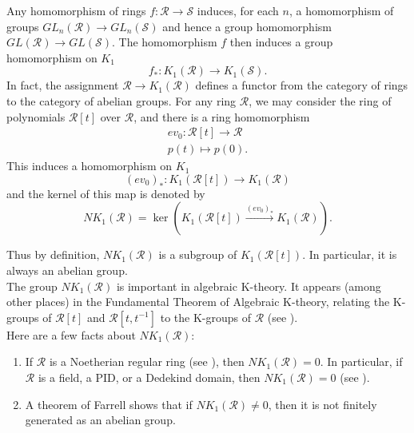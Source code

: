 \documentclass{amsart}
\newcommand{\si}{\index}
\theoremstyle{definition}
\theoremstyle{definition}
\newcommand{\calR}{\mathcal{R}}
\newcommand{\calS}{\mathcal{S}}
\numberwithin{equation}{subsection}
\begin{document}
Any homomorphism of rings $f \colon \calR \to \calS$ induces, for each $n$, a homomorphism of groups $GL_{n}(\calR) \to GL_{n}(\calS)$ and hence a group homomorphism $GL(\calR) \to GL(\calS)$. The homomorphism $f$ then induces a group homomorphism on $K_{1}$
$$f_{*} \colon K_{1}(\calR) \to K_{1}(\calS).$$
In fact, the assignment $\calR \to K_{1}(\calR)$ defines a functor from the category of rings to the category of abelian groups. For any ring $\calR$, we may consider the ring of polynomials $\calR[t]$ over $\calR$, and there is a ring homomorphism
\begin{gather*}
ev_{0} \colon \calR[t] \to \calR\\
p(t) \mapsto p(0).
\end{gather*}
This induces a homomorphism on $K_{1}$
$$(ev_{0})_{*} \colon K_{1}(\calR[t]) \to K_{1}(\calR)$$
and the kernel of this map is denoted by\si{$NK_{1}$ of a ring}
$$NK_{1}(\calR) = \ker \left(K_{1}(\calR[t]) \stackrel{(ev_{0})_{*}}\longrightarrow K_{1}(\calR)\right).$$

Thus by definition, $NK_{1}(\calR)$ is a subgroup of $K_{1}(\calR[t])$. In particular, it is always an abelian group.\\

The group $NK_{1}(\calR)$ is important in algebraic K-theory. It appears (among other places) in the Fundamental Theorem of Algebraic K-theory, relating the K-groups of $\calR[t]$ and $\calR[t,t^{-1}]$ to the K-groups of $\calR$
(see \cite[Chapter III]{WeibelBook}).\\



Here are a few facts about $NK_{1}(\calR)$:
\begin{enumerate}
\item
  If $\calR$ is a Noetherian regular ring
  (see \cite[Chapter 3]{RosenbergBook}), then $NK_{1}(\calR) = 0$. In particular, if $\calR$ is a field, a PID, or a Dedekind domain, then $NK_{1}(\calR) = 0$ (see \cite[III.3.8]{WeibelBook}).
\item
A theorem of Farrell \cite{Farrell} shows that if $NK_{1}(\calR) \ne 0$, then it is not finitely generated as an abelian group.
\end{enumerate}
\end{document}
